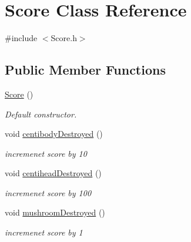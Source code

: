 \hypertarget{class_score}{}\section{Score Class Reference}
\label{class_score}


{\ttfamily \#include $<$Score.\+h$>$}

\subsection*{Public Member Functions}
\begin{DoxyCompactItemize}
\item 
\mbox{\label{class_score_a039c99843551e5e4b512ecee99e46617}} 
\mbox{\hyperlink{class_score_a039c99843551e5e4b512ecee99e46617}{Score}} ()
\begin{DoxyCompactList}\small\item\em Default constructor. \end{DoxyCompactList}\item 
\mbox{\label{class_score_af528fa0a895220415d8a40e8701fbf83}} 
void \mbox{\hyperlink{class_score_af528fa0a895220415d8a40e8701fbf83}{centibody\+Destroyed}} ()
\begin{DoxyCompactList}\small\item\em incremenet score by 10 \end{DoxyCompactList}\item 
\mbox{\label{class_score_a49699b21f9cf96146e748a2e3e421da1}} 
void \mbox{\hyperlink{class_score_a49699b21f9cf96146e748a2e3e421da1}{centihead\+Destroyed}} ()
\begin{DoxyCompactList}\small\item\em incremenet score by 100 \end{DoxyCompactList}\item 
\mbox{\label{class_score_a37cf9cd2c42c1e7ec56439e555cc5e5e}} 
void \mbox{\hyperlink{class_score_a37cf9cd2c42c1e7ec56439e555cc5e5e}{mushroom\+Destroyed}} ()
\begin{DoxyCompactList}\small\item\em incremenet score by 1 \end{DoxyCompactList}\item 
\mbox{\label{class_score_af89eeb4b0f9bab8100515d8a64d02ce2}} 

\end{DoxyCompactItemize}
